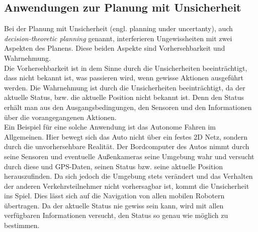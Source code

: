 \subsection{Anwendungen zur Planung mit Unsicherheit}
Bei der Planung mit Unsicherheit (engl. planning under uncertanty), auch \textit{decision-theoretic planning} genannt, interferieren Ungewissheiten mit zwei Aspekten des Planens. Diese beiden Aspekte sind Vorhersehbarkeit und Wahrnehmung. \cite[~S. 435 ff.]{Lav06}\\
Die Vorhersehbarkeit ist in dem Sinne durch die Unsicherheiten beeinträchtigt, dass nicht bekannt ist, was passieren wird, wenn gewisse Aktionen ausgeführt werden. Die Wahrnehmung ist durch die Unsicherheiten beeinträchtigt, da der aktuelle Status, bzw. die aktuelle Position nicht bekannt ist. Denn den Status erhält man aus den Ausgangsbedingungen, den Sensoren und den Informationen über die vorangegangenen Aktionen.\\
Ein Beispiel für eine solche Anwendung ist das Autonome Fahren im Allgemeinen. %
 Hier bewegt sich das Auto nicht über ein festes 2D Netz, sondern durch die unvorhersehbare Realität. Der Bordcomputer des Autos nimmt durch seine Sensoren und eventuelle Außenkameras seine Umgebung wahr und versucht durch diese und GPS-Daten, seinen Status bzw. seine aktuelle Position herauszufinden. Da sich jedoch die Umgebung stets verändert und das Verhalten der anderen Verkehrsteilnehmer nicht vorhersagbar ist, kommt die Unsicherheit ins Spiel.
Dies lässt sich auf die Navigation von allen mobilen Robotern übertragen.
Da der aktuelle Status nie gewiss sein kann, wird mit allen verfügbaren Informationen versucht, den Status so genau wie möglich zu bestimmen.
